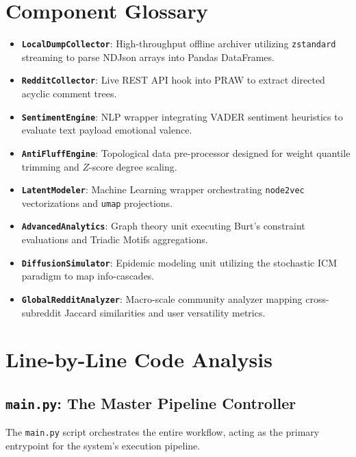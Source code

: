 \documentclass[12pt,a4paper]{report}
\begin{document}
\chapter{Component Glossary}
\begin{itemize}
    \item \textbf{\texttt{LocalDumpCollector}}: High-throughput offline archiver utilizing \texttt{zstandard} streaming to parse NDJson arrays into Pandas DataFrames.
    \item \textbf{\texttt{RedditCollector}}: Live REST API hook into PRAW to extract directed acyclic comment trees.
    \item \textbf{\texttt{SentimentEngine}}: NLP wrapper integrating VADER sentiment heuristics to evaluate text payload emotional valence.
    \item \textbf{\texttt{AntiFluffEngine}}: Topological data pre-processor designed for weight quantile trimming and $Z$-score degree scaling.
    \item \textbf{\texttt{LatentModeler}}: Machine Learning wrapper orchestrating \texttt{node2vec} vectorizations and \texttt{umap} projections.
    \item \textbf{\texttt{AdvancedAnalytics}}: Graph theory unit executing Burt's constraint evaluations and Triadic Motifs aggregations.
    \item \textbf{\texttt{DiffusionSimulator}}: Epidemic modeling unit utilizing the stochastic ICM paradigm to map info-cascades.
    \item \textbf{\texttt{GlobalRedditAnalyzer}}: Macro-scale community analyzer mapping cross-subreddit Jaccard similarities and user versatility metrics.
\end{itemize}

\chapter{Line-by-Line Code Analysis}

\section{\texttt{main.py}: The Master Pipeline Controller}
The \texttt{main.py} script orchestrates the entire workflow, acting as the primary entrypoint for the system's execution pipeline.
\end{document}
